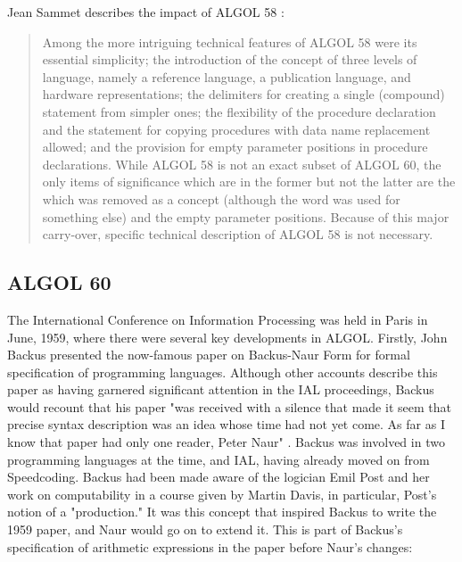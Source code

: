 Jean Sammet describes the impact of ALGOL 58
\cite{sammet_programming_languages_history_and_fundamentals_1969}:
\begin{quotation}
	Among the more intriguing technical features of ALGOL 58 were its essential
	simplicity; the introduction of the concept of three levels of language, namely
	a reference language, a publication language, and hardware representations; the
	 delimiters for creating a single (compound) statement from simpler
	ones; the flexibility of the procedure declaration and the  statement for
	copying procedures with data name replacement allowed; and the provision for
	empty parameter positions in procedure declarations. While ALGOL 58 is not an
	exact subset of ALGOL 60, the only items of significance which are in the
	former but not the latter are the  which was removed as a concept (although
	the word was used for something else) and the empty parameter positions.
	Because of this major carry-over, specific technical description of ALGOL 58 is
	not necessary.
\end{quotation}

\subsection{ALGOL 60}


The International Conference on Information Processing was held in Paris
in June, 1959, where there were several key developments in ALGOL.
Firstly, John Backus presented the now-famous paper on Backus-Naur Form
for formal specification of programming languages\cite{backus_ial_1959}.
Although other accounts describe this paper as having garnered significant
attention in the IAL proceedings, Backus would recount that his paper
"was received with a silence that made it seem that precise syntax
description was an idea whose time had not yet come.
As far as I know that paper had only one reader, Peter Naur"
\cite{Backus_1980_Programming_in_America_in_1950s}.
Backus was involved in two programming languages at the time, \FTN{} and IAL,
having already moved on from Speedcoding.
Backus had been made aware of the logician Emil Post and her work on computability
in a course given by Martin Davis, in particular, Post's notion of a "production."
It was this concept that inspired Backus to write the 1959 paper, and Naur
would go on to extend it. This is part of Backus's specification of arithmetic expressions
in the paper before Naur's changes\cite{backus_ial_1959}:

